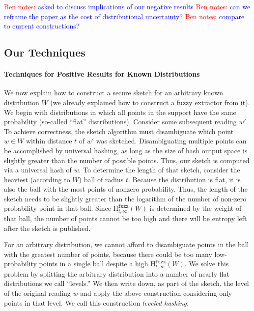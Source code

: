 \documentclass[11pt]{article}
\newcommand{\Hfuzz}{\mathrm{H}^{\mathtt{fuzz}}_{t,\infty}}
\newcommand{\authnote}[2]{{\textcolor{red}{\textsf{#1 notes: }\textcolor{blue}{ #2}}\marginpar{\textcolor{red}{\textbf{!!!!!}}}}}
\newcommand{\authnote}[2]{}
\newcommand{\bnote}[1]{{\authnote{Ben}{#1}}}
\begin{document}
\bnote{asked to discuss implications of our negative results}
\bnote{can we reframe the paper as the cost of distributional uncertainty?}
\bnote{compare to current constructions?}
\subsection{Our Techniques}

\paragraph{Techniques for Positive Results for Known Distributions} We now explain how to construct a secure sketch for an arbitrary known distribution $W$ (we already explained how to construct a fuzzy extractor from it).  We begin with distributions in which all points in the support have the same probability (so-called ``flat'' distributions).   Consider some subsequent reading $w'$. To achieve correctness, the sketch algorithm must disambiguate which point $w\in W$ within distance $t$ of $w'$ was sketched. Disambiguating multiple points can be accomplished by universal hashing, as long as the size of hash output space is slightly greater than the number of possible points. Thus, our sketch is computed via a universal hash of $w$. To determine the length of that sketch, consider the heaviest (according to $W$) ball of radius $t$. Because the distribution is flat, it is also the ball with the most points of nonzero probability. Thus, the length of the sketch needs to be slightly greater than the logarithm of the number of non-zero probability point in that ball. Since $\Hfuzz(W)$ is determined by the weight of that ball, the number of points cannot be too high and there will be entropy left after the sketch is published.

For an arbitrary distribution, we cannot afford to disambiguate points in the ball with the greatest number of points, because there could be too many low-probability points in a single ball despite a high $\Hfuzz(W)$.  We solve this problem by splitting the arbitrary distribution into a number of nearly flat distributions we call ``levels.''  We then write down, as part of the sketch, the level of the original reading $w$ and apply the above construction considering only points in that level.  We call this construction \emph{leveled hashing}.%
\end{document}
